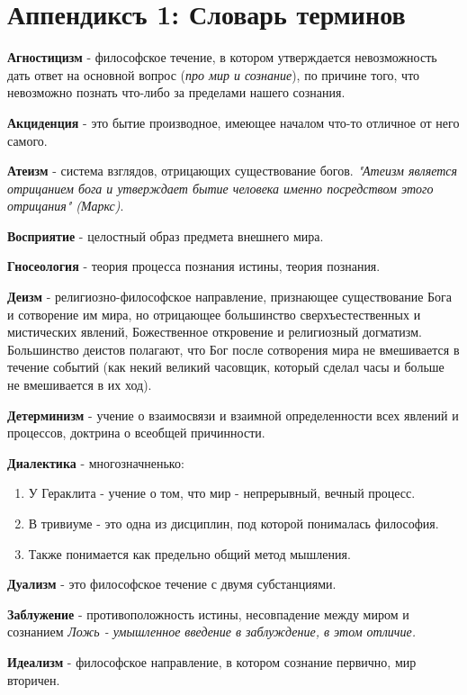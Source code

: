 \section{Аппендиксъ 1: Словарь терминов}
\hspace{15pt}\textbf{Агностицизм} - философское течение, в котором утверждается невозможность дать ответ на основной вопрос (\textit{про мир и сознание}), по причине того, что невозможно познать что-либо за пределами нашего сознания.

\textbf{Акциденция} - это бытие производное, имеющее началом что-то отличное от него самого.

\textbf{Атеизм} -  система взглядов, отрицающих существование богов. \textit{"Атеизм является отрицанием бога и утверждает бытие человека именно посредством этого отрицания" (Маркс)}.

\textbf{Восприятие} - целостный образ предмета внешнего мира.

\textbf{Гносеология} - теория процесса познания истины, теория познания.

\textbf{Деизм} -  религиозно-философское направление, признающее существование Бога и сотворение им мира, но отрицающее большинство сверхъестественных и мистических явлений, Божественное откровение и религиозный догматизм. Большинство деистов полагают, что Бог после сотворения мира не вмешивается в течение событий (как некий великий часовщик, который сделал часы и больше не вмешивается в их ход).

\textbf{Детерминизм} - учение о взаимосвязи и взаимной определенности всех явлений и процессов, доктрина о всеобщей причинности.

\textbf{Диалектика} - многозначненько:
\begin{enumerate}
\item У Гераклита - учение о том, что мир - непрерывный, вечный процесс.
\item В тривиуме - это одна из дисциплин, под которой понималась философия.
\item Также понимается как предельно общий метод мышления.
\end{enumerate}

\textbf{Дуализм} - это философское течение с двумя субстанциями.

\textbf{Заблужение} - противоположность истины, несовпадение между миром и сознанием \textit{Ложь - умышленное введение в заблуждение, в этом отличие.}

\textbf{Идеализм} - философское направление, в котором сознание первично, мир вторичен.

